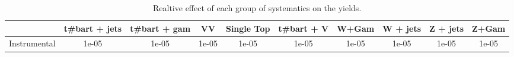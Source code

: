 \begin{table}[htbp]
\begin{center}
\begin{tabular}{|c|c|c|c|c|c|c|c|c|c|}
\hline 
      & t#bar{t} + jets      & t#bar{t} +  gam      & VV      & Single Top      & t#bar{t} + V      & W+Gam      & W + jets      & Z + jets      & Z+Gam \\ 
\hline 
 Instrumental & 1e-05 & 1e-05 & 1e-05 & 1e-05 & 1e-05 & 1e-05 & 1e-05 & 1e-05 & 1e-05 \\ 
\hline 
\end{tabular} 
\caption{Realtive effect of each group of systematics on the yields.} 
\end{center} 
\end{table} 
